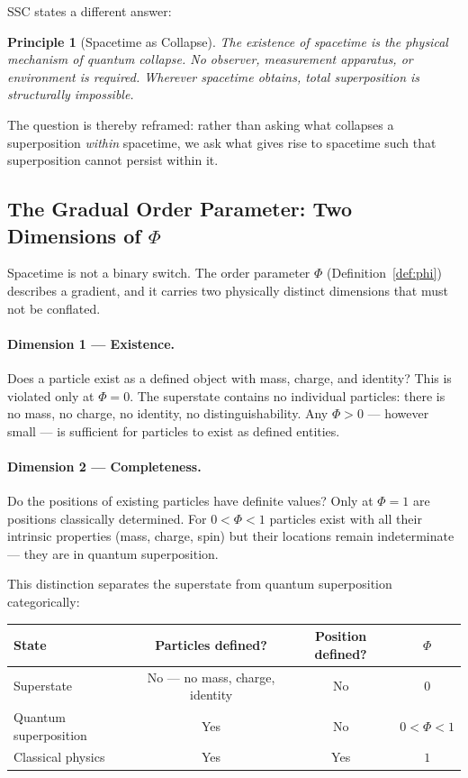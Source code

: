 \documentclass[12pt,a4paper]{article}
\newtheorem{principle}{Principle}
\begin{document}
SSC states a different answer:

\begin{principle}[Spacetime as Collapse]
\label{pr:collapse}
The existence of spacetime is the physical mechanism of quantum
collapse.  No observer, measurement apparatus, or environment is
required.  Wherever spacetime obtains, total superposition is
structurally impossible.
\end{principle}

\noindent
The question is thereby reframed: rather than asking what collapses a
superposition \emph{within} spacetime, we ask what gives rise to
spacetime such that superposition cannot persist within it.

\subsection{The Gradual Order Parameter: Two Dimensions of \texorpdfstring{$\Phi$}{Phi}}
\label{sec:twodimensions}

Spacetime is not a binary switch.  The order parameter $\Phi$
(Definition~\ref{def:phi}) describes a gradient, and it carries two
physically distinct dimensions that must not be conflated.

\paragraph{Dimension 1 — Existence.}
Does a particle exist as a defined object with mass, charge, and
identity?  This is violated only at $\Phi = 0$.  The superstate contains
no individual particles: there is no mass, no charge, no identity, no
distinguishability.  Any $\Phi > 0$ — however small — is sufficient for
particles to exist as defined entities.

\paragraph{Dimension 2 — Completeness.}
Do the positions of existing particles have definite values?  Only
at $\Phi = 1$ are positions classically determined.  For
$0 < \Phi < 1$ particles exist with all their intrinsic properties
(mass, charge, spin) but their locations remain indeterminate — they
are in quantum superposition.

This distinction separates the superstate from quantum superposition
categorically:

\begin{center}
\renewcommand{\arraystretch}{1.3}
\begin{tabular}{lccc}
\toprule
\textbf{State} & \textbf{Particles defined?} & \textbf{Position defined?} & \textbf{$\Phi$}\\
\midrule
Superstate & No — no mass, charge, identity & No & $0$\\
Quantum superposition & Yes & No & $0 < \Phi < 1$\\
Classical physics & Yes & Yes & $1$\\
\bottomrule
\end{tabular}
\end{center}
\end{document}
